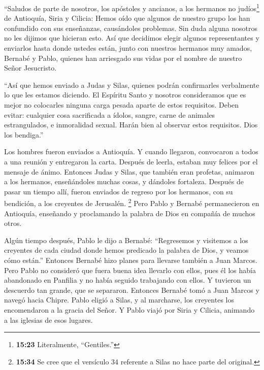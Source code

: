 ``Saludos de parte de nosotros, los apóstoles y ancianos, a los hermanos
no judíos\footnote{\textbf{15:23} Literalmente, ``Gentiles.''} de
Antioquía, Siria y Cilicia:  Hemos oído que algunos de
nuestro grupo los han confundido con sus enseñanzas, causándoles
problemas. Sin duda alguna nosotros no les dijimos que hicieran esto.
 Así que decidimos elegir algunos representantes y
enviarlos hasta donde ustedes están, junto con nuestros hermanos muy
amados, Bernabé y Pablo,  quienes han arriesgado sus vidas
por el nombre de nuestro Señor Jesucristo.

 ``Así que hemos enviado a Judas y Silas, quienes podrán
confirmarles verbalmente lo que les estamos diciendo.  El
Espíritu Santo y nosotros consideramos que es mejor no colocarles
ninguna carga pesada aparte de estos requisitos.  Deben
evitar: cualquier cosa sacrificada a ídolos, sangre, carne de animales
estrangulados, e inmoralidad sexual. Harán bien al observar estos
requisitos. Dios los bendiga.''

 Los hombres fueron enviados a Antioquía. Y cuando
llegaron, convocaron a todos a una reunión y entregaron la carta.
 Después de leerla, estaban muy felices por el mensaje de
ánimo.  Entonces Judas y Silas, que también eran profetas,
animaron a los hermanos, enseñándoles muchas cosas, y dándoles
fortaleza.  Después de pasar un tiempo allí, fueron
enviados de regreso por los hermanos, con su bendición, a los creyentes
de Jerusalén.  \footnote{\textbf{15:34} Se cree que el
  versículo 34 referente a Silas no hace parte del original.}
 Pero Pablo y Bernabé permanecieron en Antioquía, enseñando
y proclamando la palabra de Dios en compañía de muchos otros.

 Algún tiempo después, Pablo le dijo a Bernabé:
``Regresemos y visitemos a los creyentes de cada ciudad donde hemos
predicado la palabra de Dios, y veamos cómo están.'' 
Entonces Bernabé hizo planes para llevarse también a Juan Marcos.
 Pero Pablo no consideró que fuera buena idea llevarlo con
ellos, pues él los había abandonado en Panfilia y no había seguido
trabajando con ellos.  Y tuvieron un descuerdo tan grande,
que se separaron. Entonces Bernabé tomó a Juan Marcos y navegó hacia
Chipre.  Pablo eligió a Silas, y al marcharse, los
creyentes los encomendaron a la gracia del Señor.  Y Pablo
viajó por Siria y Cilicia, animando a las iglesias de esos lugares.

